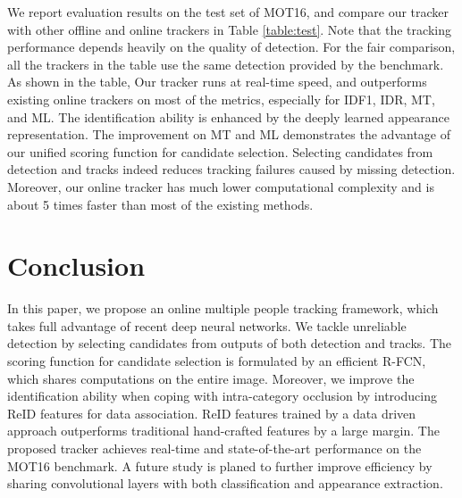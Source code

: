 \documentclass{article}
\begin{document}
We report evaluation results on the test set of MOT16,
and compare our tracker with other offline and online trackers in Table \ref{table:test}.
Note that the tracking performance depends heavily on the quality of detection.
For the fair comparison, all the trackers in the table use the same detection provided by the benchmark.
As shown in the table,
Our tracker runs at real-time speed,
and outperforms existing online trackers on most of the metrics, 
especially for IDF1, IDR, MT, and ML.
The identification ability is enhanced by the deeply learned appearance representation.
The improvement on MT and ML demonstrates 
the advantage of our unified scoring function for candidate selection.
Selecting candidates from detection and tracks indeed reduces tracking failures caused by missing detection.
Moreover, our online tracker has much lower computational complexity
and is about 5 times faster than most of the existing methods.








\section{Conclusion}
In this paper, 
we propose an online multiple people tracking framework,
which takes full advantage of recent deep neural networks.
We tackle unreliable detection by selecting candidates from 
outputs of both detection and tracks.
The scoring function for candidate selection is formulated by an efficient R-FCN,
which shares computations on the entire image.
Moreover, we improve the identification ability when coping with intra-category occlusion
by introducing ReID features for data association.
ReID features trained by a data driven approach outperforms traditional hand-crafted features by a large margin.
The proposed tracker achieves real-time and state-of-the-art performance on the MOT16 benchmark.
A future study is planed to further improve efficiency by 
sharing convolutional layers with both classification and appearance extraction.


\begin{spacing}{0.98}


\small


\end{spacing} 
\end{document}
